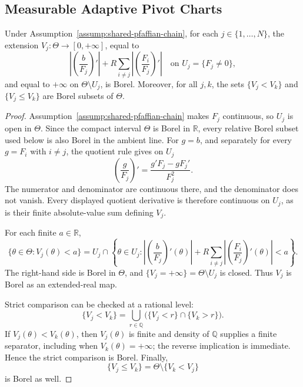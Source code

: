 \subsection{Measurable Adaptive Pivot Charts}
\label{app:step-002}

\begin{lemma}
\label{lem:step-002-borel-velocities}
Under Assumption~\ref{assump:shared-pfaffian-chain}, for each
$j\in\{1,\ldots,N\}$, the extension $V_j:\Theta\to[0,+\infty]$, equal to
\[
\left|\left(\frac b{F_j}\right)'\right|
+R\sum_{i\neq j}\left|\left(\frac{F_i}{F_j}\right)'\right|
\quad\text{on }U_j=\{F_j\neq0\},
\]
and equal to $+\infty$ on $\Theta\setminus U_j$, is Borel.  Moreover, for
all $j,k$, the sets $\{V_j<V_k\}$ and $\{V_j\leq V_k\}$ are Borel subsets
of $\Theta$.
\end{lemma}

\begin{proof}
Assumption~\ref{assump:shared-pfaffian-chain} makes $F_j$ continuous, so
$U_j$ is open in $\Theta$.  Since the compact interval $\Theta$ is Borel in
$\mathbb R$, every relative Borel subset used below is also Borel in the
ambient line.  For $g=b$, and separately for every $g=F_i$ with $i\neq j$,
the quotient rule gives on $U_j$
\[
\left(\frac g{F_j}\right)'
=\frac{g'F_j-gF_j'}{F_j^2}.
\]
The numerator and denominator are continuous there, and the denominator does
not vanish.  Every displayed quotient derivative is therefore continuous on
$U_j$, as is their finite absolute-value sum defining $V_j$.

For each finite $a\in\mathbb R$,
\[
\{\theta\in\Theta:V_j(\theta)<a\}
=U_j\cap
\left\{\theta\in U_j:
\left|\left(\frac b{F_j}\right)'(\theta)\right|
+R\sum_{i\neq j}
\left|\left(\frac{F_i}{F_j}\right)'(\theta)\right|<a
\right\}.
\]
The right-hand side is Borel in $\Theta$, and
$\{V_j=+\infty\}=\Theta\setminus U_j$ is closed.  Thus $V_j$ is Borel as
an extended-real map.

Strict comparison can be checked at a rational level:
\[
\{V_j<V_k\}
=\bigcup_{r\in\mathbb Q}
\bigl(\{V_j<r\}\cap\{V_k>r\}\bigr).
\]
If $V_j(\theta)<V_k(\theta)$, then $V_j(\theta)$ is finite and density of
$\mathbb Q$ supplies a finite separator, including when
$V_k(\theta)=+\infty$; the reverse implication is immediate.  Hence the
strict comparison is Borel.  Finally,
\[
\{V_j\leq V_k\}=\Theta\setminus\{V_k<V_j\}
\]
is Borel as well.
\end{proof}

